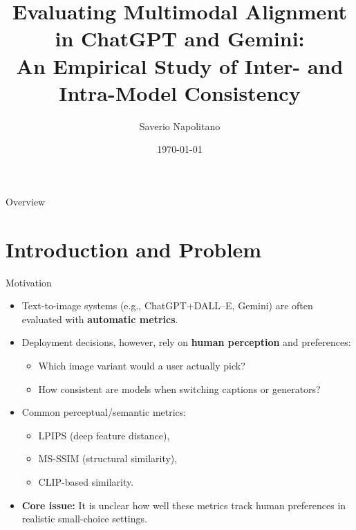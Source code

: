 \documentclass[aspectratio=169]{beamer}
\title[Multimodal Alignment in ChatGPT \& Gemini]{Evaluating Multimodal Alignment in ChatGPT and Gemini:\\
An Empirical Study of Inter- and Intra-Model Consistency}
\author[S. Napolitano]{Saverio Napolitano}
\institute[Mid Sweden University]{Mid Sweden University}
\date{\today}
\begin{document}
\begin{frame}
  \titlepage
\end{frame}

\begin{frame}{Overview}
  \tableofcontents
\end{frame}

\section{Introduction and Problem}

\begin{frame}{Motivation}
  \begin{itemize}
    \item Text-to-image systems (e.g., ChatGPT+DALL--E, Gemini) are often
          evaluated with \textbf{automatic metrics}.
    \item Deployment decisions, however, rely on \textbf{human perception}
          and preferences:
      \begin{itemize}
        \item Which image variant would a user actually pick?
        \item How consistent are models when switching captions or generators?
      \end{itemize}
    \item Common perceptual/semantic metrics:
      \begin{itemize}
        \item LPIPS (deep feature distance),
        \item MS-SSIM (structural similarity),
        \item CLIP-based similarity.
      \end{itemize}
    \item \textbf{Core issue:} It is unclear how well these metrics track
          human preferences in realistic small-choice settings.
  \end{itemize}
\end{frame}
\end{document}
